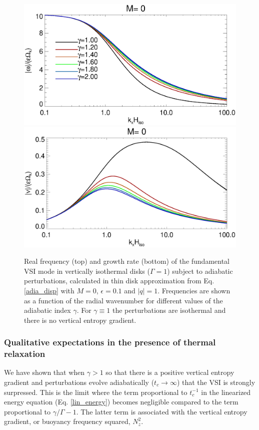 \begin{figure}
  \includegraphics[width=\linewidth,clip=true,trim=0cm 1.75cm 0cm 0cm]{figures/rate_theory_om}
  \includegraphics[width=\linewidth,clip=true,trim=0cm 0cm 0cm 1cm]{figures/rate_theory_nu}
  \caption{Real frequency (top) and growth rate (bottom) of the fundamental VSI mode in vertically 
    isothermal disks ($\Gamma=1$) subject to adiabatic perturbations,
    calculated in thin disk approximation from Eq. \ref{adia_disp}
    with $M=0$, $\epsilon=0.1$ and  
    $|q|=1$. Frequencies are shown as a function of the radial
    wavenumber for different values of the adiabatic index
    $\gamma$. For $\gamma\equiv 1$ the perturbations are isothermal
    and there is no vertical entropy gradient.\label{adia_growth}}  
\end{figure}   

\subsubsection{Qualitative expectations in the presence of thermal
  relaxation}
We have shown that when $\gamma>1$ so that there is a positive
vertical entropy gradient and perturbations evolve
adiabatically ($t_c\to\infty$) that the VSI is strongly
surpressed. This is the limit where the term proportional to
$t_c^{-1}$ in the linearized energy equation (Eq. \ref{lin_energy})
becomes negligible compared to the term proportional to
$\gamma/\Gamma-1$. The latter term is associated with the vertical
entropy gradient, or buoyancy frequency squared, $N_z^2$. 

